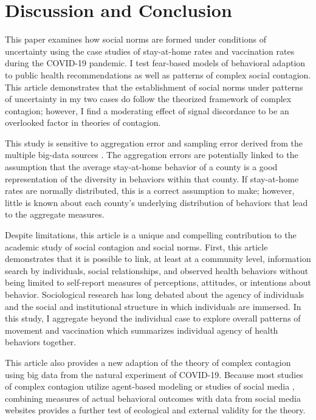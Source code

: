 \hypertarget{discussion-and-conclusion}{\section{Discussion and Conclusion}\label{discussion-and-conclusion}}

This paper examines how social norms are formed under conditions of uncertainty
using the case studies of stay-at-home rates and vaccination rates during the
COVID-19 pandemic. I test fear-based models of behavioral adaption to public
health recommendations as well as patterns of complex social contagion. This
article demonstrates that the establishment of social norms under patterns of
uncertainty in my two cases do follow the theorized framework of complex
contagion; however, I find a moderating effect of signal discordance to be an
overlooked factor in theories of contagion.

This study is sensitive to aggregation error and sampling error derived from the
multiple big-data sources \citep{facebook20, google2020}. The aggregation errors
are potentially linked to the assumption that the average stay-at-home behavior
of a county is a good representation of the diversity in behaviors within that
county. If stay-at-home rates are normally distributed, this is a correct
assumption to make; however, little is known about each county's underlying
distribution of behaviors that lead to the aggregate measures.

Despite limitations, this article is a unique and compelling contribution
to the academic study of social contagion and social norms. First, this article
demonstrates that it is possible to link, at least at a community level,
information search by individuals, social relationships, and observed health
behaviors without being limited to self-report measures of perceptions,
attitudes, or intentions about behavior. Sociological research has long debated
about the agency of individuals and the social and institutional structure in
which individuals are immersed. In this study, I aggregate beyond the individual
case to explore overall patterns of movement and vaccination which summarizes
individual agency of health behaviors together.

This article also provides a new adaption of the theory of complex contagion
using big data from the natural experiment of COVID-19. Because most studies of
complex contagion utilize agent-based modeling or studies of social media
\citep{aralExerciseContagionGlobal2017,sprague_house17,bond_etal12,latane_etal94},
combining measures of actual behavioral outcomes with data from social media
websites provides a further test of ecological and external validity for the
theory.

